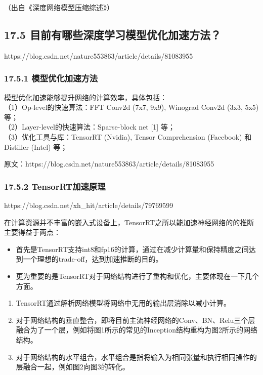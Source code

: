 （出自《深度网络模型压缩综述》）

\subsection{17.5
目前有哪些深度学习模型优化加速方法？}\label{ux76eeux524dux6709ux54eaux4e9bux6df1ux5ea6ux5b66ux4e60ux6a21ux578bux4f18ux5316ux52a0ux901fux65b9ux6cd5}

https://blog.csdn.net/nature553863/article/details/81083955

\subsubsection{17.5.1
模型优化加速方法}\label{ux6a21ux578bux4f18ux5316ux52a0ux901fux65b9ux6cd5}

模型优化加速能够提升网络的计算效率，具体包括：\\
（1）Op-level的快速算法：FFT Conv2d (7x7, 9x9), Winograd Conv2d (3x3,
5x5) 等；\\
（2）Layer-level的快速算法：Sparse-block net {[}1{]} 等；\\
（3）优化工具与库：TensorRT (Nvidia), Tensor Comprehension (Facebook) 和
Distiller (Intel) 等；

原文：https://blog.csdn.net/nature553863/article/details/81083955

\subsubsection{17.5.2
TensorRT加速原理}\label{tensorrtux52a0ux901fux539fux7406}

https://blog.csdn.net/xh\_hit/article/details/79769599

​
在计算资源并不丰富的嵌入式设备上，TensorRT之所以能加速神经网络的的推断主要得益于两点：

\begin{itemize}
\item
  首先是TensorRT支持int8和fp16的计算，通过在减少计算量和保持精度之间达到一个理想的trade-off，达到加速推断的目的。
\item
  更为重要的是TensorRT对于网络结构进行了重构和优化，主要体现在一下几个方面。
\end{itemize}

\begin{enumerate}
\def\labelenumi{(\arabic{enumi})}
\item
  TensorRT通过解析网络模型将网络中无用的输出层消除以减小计算。
\item
  对于网络结构的垂直整合，即将目前主流神经网络的Conv、BN、Relu三个层融合为了一个层，例如将图1所示的常见的Inception结构重构为图2所示的网络结构。
\item
  对于网络结构的水平组合，水平组合是指将输入为相同张量和执行相同操作的层融合一起，例如图2向图3的转化。
\end{enumerate}


